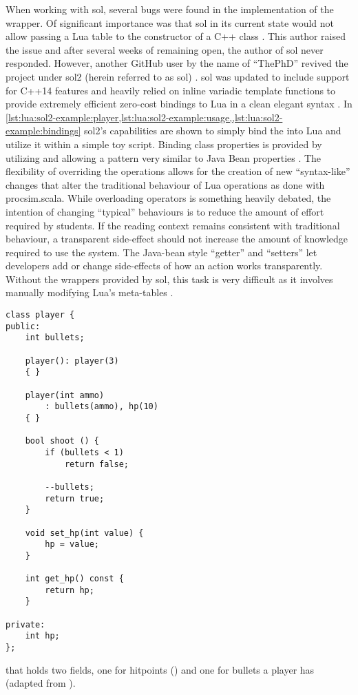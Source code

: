 When working with sol, several bugs were found in the implementation of the wrapper. Of significant importance was that sol in its current state would not allow passing a Lua table to the constructor of a C++ class \cite{Github:Rapptz:Sol:74}. This author raised the issue and after several weeks of remaining open, the author of sol never responded. However, another GitHub user by the name of ``ThePhD'' revived the project under sol2 (herein referred to as sol) \cite{Github:ThePhD:sol2}. sol was updated to include support for C++14 features and heavily relied on inline variadic template functions to provide extremely efficient zero-cost bindings to Lua in a clean elegant syntax \cite{Github:ThePhD:sol2:benchmarks, Github:ThePhD:sol2:cxx-in-lua}. In \cref{lst:lua:sol2-example:player,lst:lua:sol2-example:usage,,lst:lua:sol2-example:bindings} sol2's capabilities are shown to simply bind the  into Lua and utilize it within a simple toy script. Binding class properties is provided by utilizing  and  allowing a pattern very similar to Java Bean properties \cite{Oracle:JavaTutorial:JavaBeans}. The flexibility of overriding the operations allows for the creation of new ``syntax-like'' changes that alter the traditional behaviour of Lua operations as done with procsim.scala. While overloading operators is something heavily debated, the intention of changing ``typical'' behaviours is to reduce the amount of effort required by students. If the reading context remains consistent with traditional behaviour, a transparent side-effect should not increase the amount of knowledge required to use the system. The Java-bean style ``getter'' and ``setters'' let developers add or change side-effects of how an action works transparently. Without the wrappers provided by sol, this task is very difficult as it involves manually modifying Lua's meta-tables \cite{Github:ThePhD:sol2:usertype}.

\begin{listing}[hp]
\begin{verbatim}
class player {
public:
    int bullets;
    
    player(): player(3) 
    { }
    
    player(int ammo)
        : bullets(ammo), hp(10)
    { }
    
    bool shoot () {
        if (bullets < 1) 
            return false;
    
        --bullets;
        return true;
    }
    
    void set_hp(int value) {
        hp = value;
    }
    
    int get_hp() const {
        return hp;
    }
    
private:
    int hp;
};
\end{verbatim}
\caption{ that holds two fields, one for hitpoints () and one for bullets a player has (adapted from \cite{Github:ThePhD:sol2:cxx-in-lua}).}
\label{lst:lua:sol2-example:player}
\end{listing}

